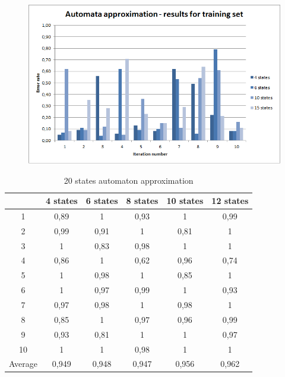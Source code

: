 \documentclass[runningheads,a4paper]{llncs}
\begin{document}
\begin{figure}
\centering
\includegraphics[scale=1]{6.png}
\end{figure}

\begin{table}[]
\centering
\caption{20 states automaton approximation}
\label{my-label}
\begin{tabular}{@{}cccccc@{}}
\toprule
        & 4 states & 6 states & 8 states & 10 states & 12 states    \\ \midrule
1       & 0,89     & 1        & 0,93     & 1         & 0,99 \\
2       & 0,99     & 0,91     & 1        & 0,81      & 1 \\
3       & 1        & 0,83     & 0,98     & 1         & 1 \\
4       & 0,86     & 1        & 0,62     & 0,96      & 0,74   \\
5       & 1        & 0,98     & 1        & 0,85      & 1   \\
6       & 1        & 0,97     & 0,99     & 1         & 0,93    \\
7       & 0,97     & 0,98     & 1        & 0,98      & 1    \\
8       & 0,85     & 1        & 0,97     & 0,96      & 0,99     \\
9       & 0,93     & 0,81     & 1        & 1         & 0,97 \\
10      & 1        & 1        & 0,98     & 1         & 1  \\
Average & 0,949    & 0,948    & 0,947    & 0,956     & 0,962  \\ \bottomrule
\end{tabular}
\end{table}
\end{document}

